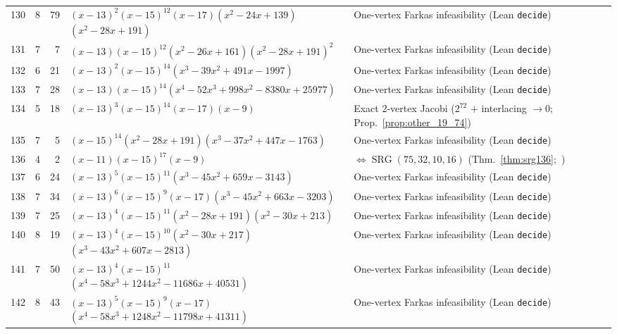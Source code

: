 \documentclass[11pt,reqno]{amsart}
\theoremstyle{definition}
\theoremstyle{remark}
\numberwithin{equation}{section}
\numberwithin{table}{section}
\DeclareMathOperator{\SRG}{SRG}
\begin{document}
{\begin{longtable}{@{}rrr>{\raggedright\arraybackslash}p{2.50in}>{\raggedright\arraybackslash}p{2.30in}@{}}
130 & 8 & 79 & $(x-13)^2$\allowbreak $(x-15)^{12}$\allowbreak $(x-17)$\allowbreak $(x^2-24x+139)$\allowbreak $(x^2-28x+191)$ & One-vertex Farkas infeasibility (Lean \texttt{decide}) \\
131 & 7 & 7 & $(x-13)$\allowbreak $(x-15)^{12}$\allowbreak $(x^2-26x+161)$\allowbreak $(x^2-28x+191)^2$ & One-vertex Farkas infeasibility (Lean \texttt{decide}) \\
132 & 6 & 21 & $(x-13)^2$\allowbreak $(x-15)^{14}$\allowbreak $(x^3-39x^2+491x-1997)$ & One-vertex Farkas infeasibility (Lean \texttt{decide}) \\
133 & 7 & 28 & $(x-13)$\allowbreak $(x-15)^{14}$\allowbreak $(x^4-52x^3+998x^2-8380x+25977)$ & One-vertex Farkas infeasibility (Lean \texttt{decide}) \\
134 & 5 & 18 & $(x-13)^3$\allowbreak $(x-15)^{14}$\allowbreak $(x-17)$\allowbreak $(x-9)$ & Exact $2$-vertex Jacobi ($2^{72}$ + interlacing $\to 0$; Prop.~\ref{prop:other_19_74}) \\
135 & 7 & 5 & $(x-15)^{14}$\allowbreak $(x^2-28x+191)$\allowbreak $(x^3-37x^2+447x-1763)$ & One-vertex Farkas infeasibility (Lean \texttt{decide}) \\
136 & 4 & 2 & $(x-11)$\allowbreak $(x-15)^{17}$\allowbreak $(x-9)$ & $\Leftrightarrow \SRG(75,32,10,16)$ (Thm.~\ref{thm:srg136};~\cite{AzarijaMarc2018}) \\
137 & 6 & 24 & $(x-13)^5$\allowbreak $(x-15)^{11}$\allowbreak $(x^3-45x^2+659x-3143)$ & One-vertex Farkas infeasibility (Lean \texttt{decide}) \\
138 & 7 & 34 & $(x-13)^6$\allowbreak $(x-15)^9$\allowbreak $(x-17)$\allowbreak $(x^3-45x^2+663x-3203)$ & One-vertex Farkas infeasibility (Lean \texttt{decide}) \\
139 & 7 & 25 & $(x-13)^4$\allowbreak $(x-15)^{11}$\allowbreak $(x^2-28x+191)$\allowbreak $(x^2-30x+213)$ & One-vertex Farkas infeasibility (Lean \texttt{decide}) \\
140 & 8 & 19 & $(x-13)^4$\allowbreak $(x-15)^{10}$\allowbreak $(x^2-30x+217)$\allowbreak $(x^3-43x^2+607x-2813)$ & One-vertex Farkas infeasibility (Lean \texttt{decide}) \\
141 & 7 & 50 & $(x-13)^4$\allowbreak $(x-15)^{11}$\allowbreak $(x^4-58x^3+1244x^2-11686x+40531)$ & One-vertex Farkas infeasibility (Lean \texttt{decide}) \\
142 & 8 & 43 & $(x-13)^5$\allowbreak $(x-15)^9$\allowbreak $(x-17)$\allowbreak $(x^4-58x^3+1248x^2-11798x+41311)$ & One-vertex Farkas infeasibility (Lean \texttt{decide}) \\

\end{longtable}}
\end{document}
